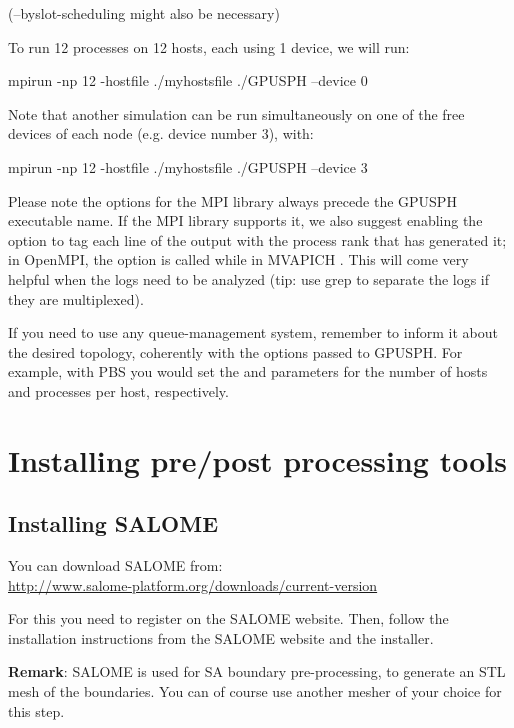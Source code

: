 \documentclass{../GPUSPHtemplate}
\begin{document}
(--byslot-scheduling might also be necessary)

To run 12 processes on 12 hosts, each using 1 device, we will run:

\begin{shellcode}
mpirun -np 12 -hostfile ./myhostsfile ./GPUSPH --device 0
\end{shellcode}

Note that another simulation can be run simultaneously on one of the free devices of each node (e.g. device number 3), with:

\begin{shellcode}
mpirun -np 12 -hostfile ./myhostsfile ./GPUSPH --device 3
\end{shellcode}

Please note the options for the MPI library always precede the GPUSPH executable name.
If the MPI library supports it, we also suggest enabling the option to tag each 
line of the output with the process rank that has generated it; 
in OpenMPI, the option is called  while in MVAPICH . 
This will come very helpful when the logs need to be analyzed (tip: use grep to separate the logs if they are multiplexed).

If you need to use any queue-management system, remember to inform it about the desired topology, 
coherently with the options passed to GPUSPH. For example, with PBS you would set the  
and  parameters for the number of hosts and processes per host, respectively.


\section{Installing pre/post processing tools}

\subsection{Installing SALOME}
You can download SALOME from:\\
\url{http://www.salome-platform.org/downloads/current-version}

For this you need to register on the SALOME website.
Then, follow the installation instructions from the SALOME website and the
installer.

\textbf{Remark}: SALOME is used for SA boundary pre-processing, to generate an
STL mesh of the boundaries. You can of course use another mesher of your 
choice for this step.
\end{document}
